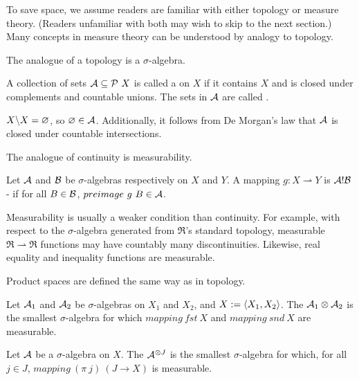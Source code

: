 \documentclass[preprint]{sigplanconf}
\newcommand{\pto}{\rightharpoonup}
\begin{document}
To save space, we assume readers are familiar with either topology or measure theory.
(Readers unfamiliar with both may wish to skip to the next section.)
Many concepts in measure theory can be understood by analogy to topology.

The analogue of a topology is a $\sigma$-algebra.

\begin{definition}
A collection of sets $\mathcal{A} \subseteq \mathcal{P}~X$ is called a  on $X$ if it contains $X$ and is closed under complements and countable unions.
The sets in $\mathcal{A}$ are called .
\end{definition}

$X \backslash X = \varnothing$, so $\varnothing \in \mathcal{A}$.
Additionally, it follows from De Morgan's law that $\mathcal{A}$ is closed under countable intersections.

The analogue of continuity is measurability.

\begin{definition}
Let $\mathcal{A}$ and $\mathcal{B}$ be $\sigma$-algebras respectively on $X$ and $Y$.
A mapping $g : X \pto Y$ is $\mathcal{A}!\mathcal{B}$- if for all $B \in \mathcal{B}$, $preimage~g~B \in \mathcal{A}$.
\end{definition}

Measurability is usually a weaker condition than continuity.
For example, with respect to the $\sigma$-algebra generated from $\Re$'s standard topology, measurable $\Re \pto \Re$ functions may have countably many discontinuities.
Likewise, real equality and inequality functions are measurable.

Product spaces are defined the same way as in topology.

\begin{definition}
Let $\mathcal{A}_1$ and $\mathcal{A}_2$ be $\sigma$-algebras on $X_1$ and $X_2$, and $X := \langle{X_1,X_2}\rangle$.
The  $\mathcal{A}_1 \otimes \mathcal{A}_2$ is the smallest $\sigma$-algebra for which $mapping~fst~X$ and $mapping~snd~X$ are measurable.
\label{def:finite-product-sigma-algebra}
\end{definition}

\begin{definition}
Let $\mathcal{A}$ be a $\sigma$-algebra on $X$.
The  $\mathcal{A}^{\otimes J}$ is the smallest $\sigma$-algebra for which, for all $j \in J$, $mapping~(\pi~j)~(J \to X)$ is measurable.
\label{def:arbitrary-product-sigma-algebra}
\end{definition}
\end{document}
